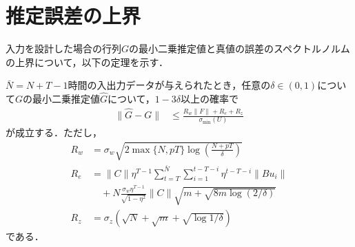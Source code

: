 \section{推定誤差の上界}
入力を設計した場合の行列$G$の最小二乗推定値と真値の誤差のスペクトルノルムの上界について，以下の定理を示す．

\begin{thm}
$\bar{N} = N + T - 1 $時間の入出力データが与えられたとき，任意の$\delta \in (0, 1)$について$G$の最小二乗推定値$\hat{G}$について，$1- 3\delta$以上の確率で
\begin{align}
\label{upper_bound}
    \|\hat{G}-G\| &\leq \frac{R_w\|F\| +R_e + R_z}{\sigma_{\mathrm{min}}(U)}
\end{align}
が成立する．ただし，
\begin{align*}
    R_w &= \sigma_w\sqrt{ 2\max\{N, pT\}\log{\left(\frac{N+pT}{\delta}\right)}}
    \\
    R_e &=\|C\|\eta^{T-1} \sum_{t = T}^{\bar{N}}\sum_{i = 1}^{t-T-i}\eta^{t-T-i}\|Bu_i\| \\ 
    &\quad + N\frac{\sigma_w\eta^{T-1}}{\sqrt{1-\eta^2}} \|C\| \sqrt{m + \sqrt{8m\log{(2/\delta)}}}
    \\
    R_z &= \sigma_z(\sqrt{N} + \sqrt{m}+ \sqrt{\log{1/\delta}})
\end{align*}
である．
\end{thm}


